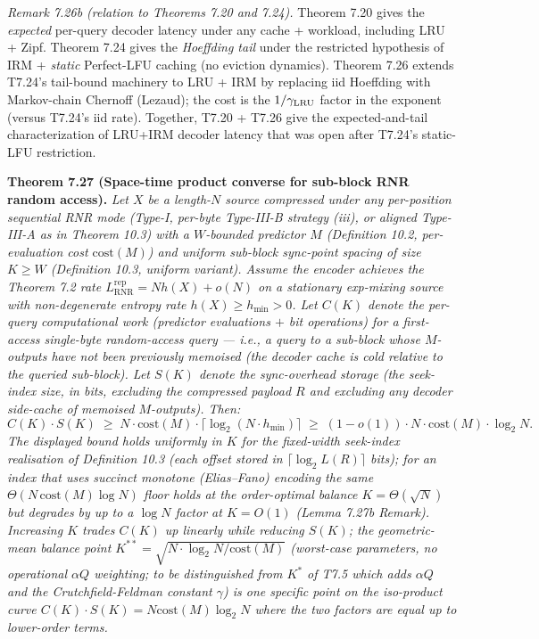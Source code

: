 \documentclass[
]{article}
\begin{document}
\emph{Remark 7.26b (relation to Theorems 7.20 and 7.24).}
Theorem 7.20 gives the \emph{expected} per-query decoder latency
under any cache + workload, including LRU + Zipf. Theorem 7.24
gives the \emph{Hoeffding tail} under the restricted hypothesis of
IRM + \emph{static} Perfect-LFU caching (no eviction dynamics).
Theorem 7.26 extends T7.24's tail-bound machinery to LRU + IRM
by replacing iid Hoeffding with Markov-chain Chernoff (Lezaud);
the cost is the $1/\gamma_{\rm LRU}$ factor in the exponent
(versus T7.24's iid rate). Together, T7.20 + T7.26 give the
expected-and-tail characterization of LRU+IRM decoder latency
that was open after T7.24's static-LFU restriction.

\textbf{Theorem 7.27 (Space-time product converse for sub-block
RNR random access).} \emph{Let $X$ be a length-$N$ source compressed
under any per-position sequential RNR mode (Type-I, per-byte
Type-III-B strategy (iii), or aligned Type-III-A as in
Theorem 10.3) with a $W$-bounded predictor $M$ (Definition 10.2,
per-evaluation cost $\mathrm{cost}(M)$) and uniform sub-block
sync-point spacing of size $K \geq W$ (Definition 10.3, uniform
variant). Assume the encoder achieves the Theorem 7.2 rate
$L^{\mathrm{rep}}_{\mathrm{RNR}} = N h(X) + o(N)$ on a stationary
exp-mixing source with non-degenerate entropy rate
$h(X) \geq h_{\min} > 0$. Let $C(K)$ denote the per-query
computational work (predictor evaluations $+$ bit operations) for a
\emph{first-access} single-byte random-access query --- i.e., a query
to a sub-block whose $M$-outputs have not been previously memoised
(the decoder cache is cold relative to the queried sub-block). Let
$S(K)$ denote the sync-overhead storage (the seek-index size, in bits,
excluding the compressed payload $R$ and excluding any decoder
side-cache of memoised $M$-outputs). Then:}
\[
  C(K) \cdot S(K) \;\geq\; N \cdot \mathrm{cost}(M) \cdot
  \bigl\lceil \log_2(N \cdot h_{\min}) \bigr\rceil
  \;\geq\; (1 - o(1)) \cdot N \cdot \mathrm{cost}(M) \cdot \log_2 N.
\]
\emph{The displayed bound holds uniformly in $K$ for the fixed-width
seek-index realisation of Definition 10.3 (each offset stored in
$\lceil\log_2 L(R)\rceil$ bits); for an index that uses succinct
monotone (Elias--Fano) encoding the same $\Theta(N\,\mathrm{cost}(M)
\log N)$ floor holds at the order-optimal balance $K=\Theta(\sqrt N)$
but degrades by up to a $\log N$ factor at $K=O(1)$ (Lemma 7.27b
Remark). Increasing $K$ trades $C(K)$ up linearly while reducing
$S(K)$; the geometric-mean balance point $K^{**} = \sqrt{N \cdot
\log_2 N / \mathrm{cost}(M)}$ (worst-case parameters, no operational
$\alpha Q$ weighting; to be distinguished from $K^*$ of T7.5 which
adds $\alpha Q$ and the Crutchfield-Feldman constant $\gamma$) is
one specific point on the iso-product curve
$C(K) \cdot S(K) = N \mathrm{cost}(M) \log_2 N$ where the two factors
are equal up to lower-order terms.}
\end{document}
